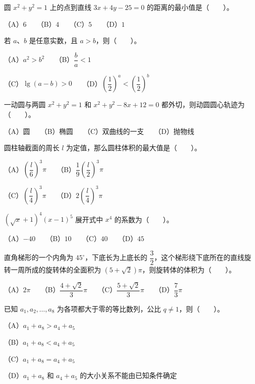 \begin{question}
圆 $x^2+y^2=1$ 上的点到直线 $3x+4y-25=0$ 的距离的最小值是\mbox{（　　）}。

（A）$6$　　（B）$4$　　（C）$5$　　（D）$1$

\end{question}
\begin{question}
若 $a\text{、}b$ 是任意实数，且 $a>b$，则\mbox{（　　）}。

（A）$a^2>b^2$　　（B）$\dfrac ba<1$

（C）$\lg(a-b)>0$　　（D）$\left(\dfrac12\right)^a<\left(\dfrac12\right)^b$

\end{question}
\begin{question}
一动圆与两圆 $x^2+y^2=1$ 和 $x^2+y^2-8x+12=0$ 都外切，则动圆圆心轨迹为\mbox{（　　）}。

（A）圆　　（B）椭圆　　（C）双曲线的一支　　（D）抛物线

\end{question}
\begin{question}
圆柱轴截面的周长 $l$ 为定值，那么圆柱体积的最大值是\mbox{（　　）}。

（A）$\left(\dfrac l6\right)^3\pi$　　（B）$\dfrac19\left(\dfrac l2\right)^3\pi$

（C）$\left(\dfrac l4\right)^3\pi$　　（D）$2\left(\dfrac l4\right)^3\pi$

\end{question}
\begin{question}
$(\sqrt{x}+1)^4(x-1)^5$ 展开式中 $x^4$ 的系数为\mbox{（　　）}。

（A）$-40$　　（B）$10$　　（C）$40$　　（D）$45$

\end{question}
\begin{question}
直角梯形的一个内角为 $45^\circ$，下底长为上底长的 $\dfrac32$，这个梯形绕下底所在的直线旋转一周所成的旋转体的全面积为 $(5+\sqrt2)\pi$，则旋转体的体积为\mbox{（　　）}。

（A）$2\pi$　　（B）$\dfrac{4+\sqrt2}{3}\pi$　　（C）$\dfrac{5+\sqrt2}{3}\pi$　　（D）$\dfrac73\pi$

\end{question}
\begin{question}
已知 $a_1,a_2,\ldots,a_8$ 为各项都大于零的等比数列，公比 $q\ne1$，则\mbox{（　　）}。

（A）$a_1+a_8>a_4+a_5$

（B）$a_1+a_8<a_4+a_5$

（C）$a_1+a_8=a_4+a_5$

（D）$a_1+a_8$ 和 $a_4+a_5$ 的大小关系不能由已知条件确定

\end{question}
